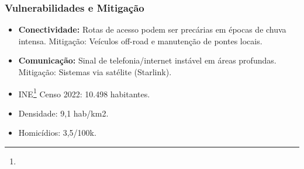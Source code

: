 \subsubsection{Vulnerabilidades e
Mitigação}

\begin{itemize}
\item
  \textbf{Conectividade:} Rotas de acesso podem ser precárias em épocas
  de chuva intensa. Mitigação: Veículos off-road e manutenção de pontes
  locais.
\item
  \textbf{Comunicação:} Sinal de telefonia/\allowbreak internet instável em áreas
  profundas. Mitigação: Sistemas via satélite (Starlink).
\item
  INE\footnote{\fineINE} Censo 2022: 10.498 habitantes.
\item
  Densidade: 9,1 hab/\allowbreak km2.
\item
  Homicídios: 3,5/\allowbreak 100k.
\end{itemize}
